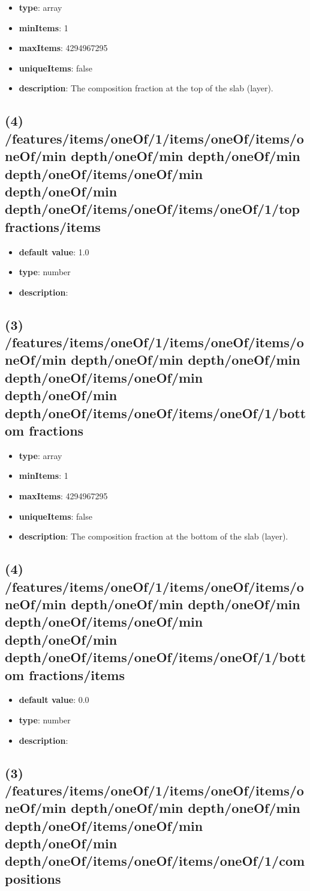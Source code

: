 \begin{itemize}[leftmargin=3em]\item {\bf type}: array
\item {\bf minItems}: 1
\item {\bf maxItems}: 4294967295
\item {\bf uniqueItems}: false
\item {\bf description}: The composition fraction at the top of the slab (layer).
\end{itemize}\subsection{(4) /features/items/oneOf/1/items/oneOf/items/oneOf/min depth/oneOf/min depth/oneOf/min depth/oneOf/items/oneOf/min depth/oneOf/min depth/oneOf/items/oneOf/items/oneOf/1/top fractions/items}
\begin{itemize}[leftmargin=4em]\item {\bf default value}: 1.0
\item {\bf type}: number
\item {\bf description}: 
\end{itemize}\subsection{(3) /features/items/oneOf/1/items/oneOf/items/oneOf/min depth/oneOf/min depth/oneOf/min depth/oneOf/items/oneOf/min depth/oneOf/min depth/oneOf/items/oneOf/items/oneOf/1/bottom fractions}
\begin{itemize}[leftmargin=3em]\item {\bf type}: array
\item {\bf minItems}: 1
\item {\bf maxItems}: 4294967295
\item {\bf uniqueItems}: false
\item {\bf description}: The composition fraction at the bottom of the slab (layer).
\end{itemize}\subsection{(4) /features/items/oneOf/1/items/oneOf/items/oneOf/min depth/oneOf/min depth/oneOf/min depth/oneOf/items/oneOf/min depth/oneOf/min depth/oneOf/items/oneOf/items/oneOf/1/bottom fractions/items}
\begin{itemize}[leftmargin=4em]\item {\bf default value}: 0.0
\item {\bf type}: number
\item {\bf description}: 
\end{itemize}\subsection{(3) /features/items/oneOf/1/items/oneOf/items/oneOf/min depth/oneOf/min depth/oneOf/min depth/oneOf/items/oneOf/min depth/oneOf/min depth/oneOf/items/oneOf/items/oneOf/1/compositions}
